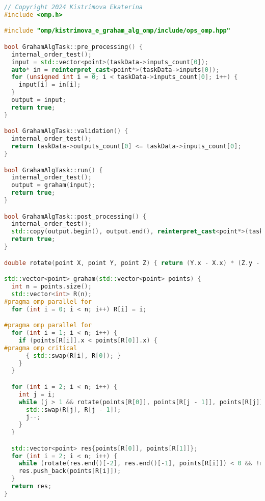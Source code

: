 \documentclass{report}
\begin{document}
\begin{lstlisting}[language=C++,caption=OpenMP версия]
// Copyright 2024 Kistrimova Ekaterina
#include <omp.h>

#include "omp/kistrimova_e_graham_alg_omp/include/ops_omp.hpp"

bool GrahamAlgTask::pre_processing() {
  internal_order_test();
  input = std::vector<point>(taskData->inputs_count[0]);
  auto* in = reinterpret_cast<point*>(taskData->inputs[0]);
  for (unsigned int i = 0; i < taskData->inputs_count[0]; i++) {
    input[i] = in[i];
  }
  output = input;
  return true;
}

bool GrahamAlgTask::validation() {
  internal_order_test();
  return taskData->outputs_count[0] <= taskData->inputs_count[0];
}

bool GrahamAlgTask::run() {
  internal_order_test();
  output = graham(input);
  return true;
}

bool GrahamAlgTask::post_processing() {
  internal_order_test();
  std::copy(output.begin(), output.end(), reinterpret_cast<point*>(taskData->outputs[0]));
  return true;
}

double rotate(point X, point Y, point Z) { return (Y.x - X.x) * (Z.y - Y.y) - (Y.y - X.y) * (Z.x - Y.x); }

std::vector<point> graham(std::vector<point> points) {
  int n = points.size();
  std::vector<int> R(n);
#pragma omp parallel for
  for (int i = 0; i < n; i++) R[i] = i;

#pragma omp parallel for
  for (int i = 1; i < n; i++) {
    if (points[R[i]].x < points[R[0]].x) {
#pragma omp critical
      { std::swap(R[i], R[0]); }
    }
  }

  for (int i = 2; i < n; i++) {
    int j = i;
    while (j > 1 && rotate(points[R[0]], points[R[j - 1]], points[R[j]]) < 0) {
      std::swap(R[j], R[j - 1]);
      j--;
    }
  }

  std::vector<point> res{points[R[0]], points[R[1]]};
  for (int i = 2; i < n; i++) {
    while (rotate(res.end()[-2], res.end()[-1], points[R[i]]) < 0 && !res.empty()) res.pop_back();
    res.push_back(points[R[i]]);
  }
  return res;
}
\end{lstlisting}

\newpage
\end{document}
